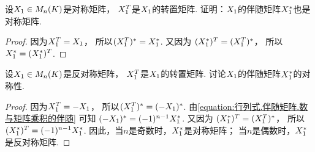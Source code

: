 \begin{example}
设\(X_1 \in M_n(K)\)是对称矩阵，
\(X_1^T\)是\(X_1\)的转置矩阵.
证明：\(X_1\)的伴随矩阵\(X_1^*\)也是对称矩阵.
\begin{proof}
因为\(X_1^T = X_1\)，
所以\((X_1^T)^* = X_1^*\).
又因为 \hyperref[equation:行列式.伴随矩阵.恒等式2]{\((X_1^*)^T = (X_1^T)^*\)}，
所以\(X_1^* = (X_1^*)^T\).
\end{proof}
\end{example}
\begin{example}
设\(X_1 \in M_n(K)\)是反对称矩阵，
\(X_1^T\)是\(X_1\)的转置矩阵.
讨论\(X_1\)的伴随矩阵\(X_1^*\)的对称性.
\begin{proof}
因为\(X_1^T = -X_1\)，
所以\((X_1^T)^* = (-X_1)^*\).
由\cref{equation:行列式.伴随矩阵.数与矩阵乘积的伴随} 可知
\((-X_1)^* = (-1)^{n-1} X_1^*\).
又因为 \hyperref[equation:行列式.伴随矩阵.恒等式2]{\((X_1^*)^T = (X_1^T)^*\)}，
所以\((X_1^*)^T = (-1)^{n-1} X_1^*\).
因此，当\(n\)是奇数时，\(X_1^*\)是对称矩阵；
当\(n\)是偶数时，\(X_1^*\)是反对称矩阵.
\end{proof}
\end{example}

